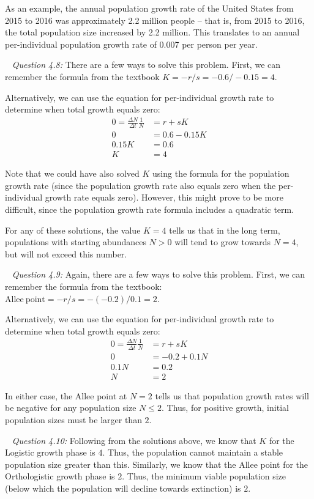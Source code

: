 \documentclass[12pt]{article}
\begin{document}
As an example, the annual population growth rate of the United States from 2015 to 2016 was approximately 2.2 million people -- that is, from 2015 to 2016, the total population size increased by 2.2 million. This translates to an annual per-individual population growth rate of 0.007 per person per year.

~\newline
\textit{Question 4.8:}
\newline
There are a few ways to solve this problem. First, we can remember the formula from the textbook $K = -r/s = -0.6/-0.15 = 4$.

Alternatively, we can use the equation for per-individual growth rate to determine when total growth equals zero:
\begin{align*}
0 = \frac{\Delta N}{\Delta t}\frac{1}{N} &= r + s K\\
0 &= 0.6 - 0.15 K \\
0.15 K &= 0.6 \\
K &= 4
\end{align*}

Note that we could have also solved $K$ using the formula for the population growth rate (since the population growth rate also equals zero when the per-individual growth rate equals zero). However, this might prove to be more difficult, since the population growth rate formula includes a quadratic term.

For any of these solutions, the value $K = 4$ tells us that in the long term, populations with starting abundances $N>0$ will tend to grow towards $N=4$, but will not exceed this number.

~\newline
\textit{Question 4.9:}
\newline
Again, there are a few ways to solve this problem. First, we can remember the formula from the textbook: $\mathrm{Allee~point} = -r/s = -(-0.2)/0.1 = 2$.

Alternatively, we can use the equation for per-individual growth rate to determine when total growth equals zero:
\begin{align*}
0 = \frac{\Delta N}{\Delta t}\frac{1}{N} &= r + s K\\
0 &= -0.2 + 0.1 N \\
0.1 N &= 0.2 \\
N &= 2
\end{align*}

In either case, the Allee point at $N = 2$ tells us that population growth rates will be negative for any population size $N\leq2$. Thus, for positive growth, initial population sizes must be larger than $2$.

~\newline
\textit{Question 4.10:}
\newline
Following from the solutions above, we know that $K$ for the Logistic growth phase is $4$. Thus, the population cannot maintain a stable population size greater than this. Similarly, we know that the Allee point for the Orthologistic growth phase is $2$. Thus, the minimum viable population size (below which the population will decline towards extinction) is $2$.
\end{document}
